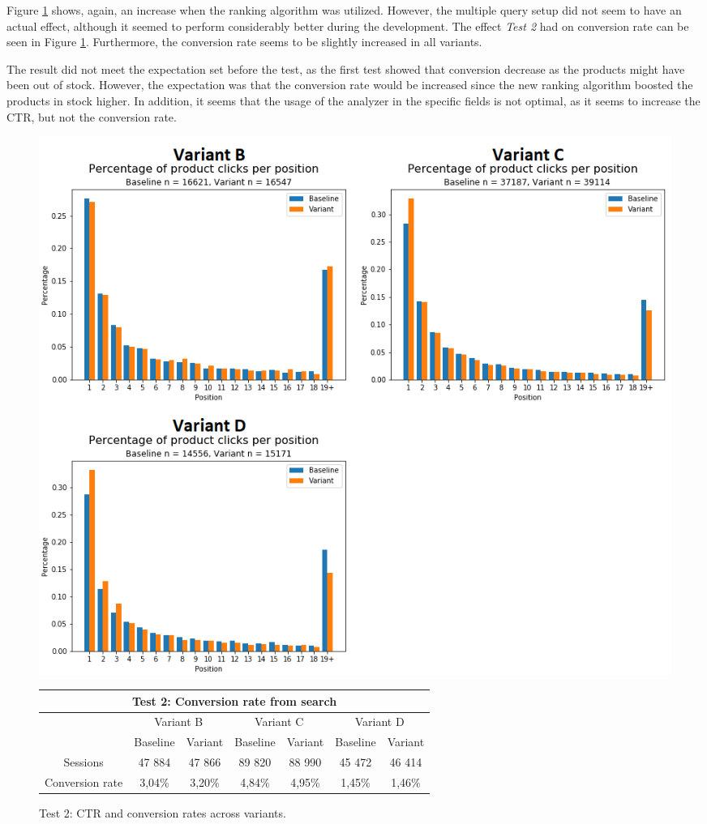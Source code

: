 Figure \ref{fig:search_v2} shows, again, an increase when the ranking algorithm was utilized.
However, the multiple query setup did not seem to have an actual effect, although it seemed to perform
considerably better during the development.
The effect \emph{Test 2} had on conversion rate can be seen in Figure \ref{fig:search_v2}.
Furthermore, the conversion rate seems to be slightly increased in all variants.

The result did not meet the expectation set before the test, as the first test showed that conversion decrease as the
products might have been out of stock.
However, the expectation was that the conversion rate would be increased since the new ranking algorithm 
boosted the products in stock higher.
In addition, it seems that the usage of the analyzer in the specific fields is not optimal, as it seems to increase
the CTR, but not the conversion rate.


\begin{figure}
    \centering
    
    \includegraphics[width=\textwidth]{img/search_v2.png}

    \begin{tabular}{|c||c|c||c|c||c|c|}
    \hline
    \multicolumn{7}{|c|}{Test 2: Conversion rate from search} \\ \hline \hline
    & \multicolumn{2}{|c||}{Variant B} & \multicolumn{2}{|c||}{Variant C} & \multicolumn{2}{|c|}{Variant D} \\ \cline{2-7}
    & Baseline & Variant & Baseline & Variant & Baseline & Variant \\ \hline
    Sessions & 47 884 & 47 866 & 89 820 & 88 990 & 45 472 & 46 414 \\ \hline
    Conversion rate & 3,04\% & 3,20\% & 4,84\% & 4,95\% & 1,45\% & 1,46\% \\ \hline
    \end{tabular}

    \caption{Test 2: CTR and conversion rates across variants.}
    \label{fig:search_v2}
\end{figure}



